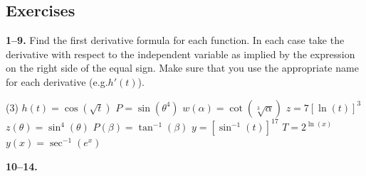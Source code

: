 \documentclass[10pt,oneside,]{book}
\theoremstyle{plain}
\theoremstyle{definition}
\numberwithin{equation}{section}
\newcounter{figstack}
\newcounter{figindex}
\newlength\fight
\newcommand\pushValignCaptionBottom[5][b]{%
\stepcounter{figstack}%
\expandafter\def\csname %
figalign\romannumeral\value{figstack}\endcsname{#1}%
\expandafter\def\csname %
figtype\romannumeral\value{figstack}\endcsname{#2}%
\expandafter\def\csname %
figwd\romannumeral\value{figstack}\endcsname{#3}%
\expandafter\def\csname %
figcontent\romannumeral\value{figstack}\endcsname{#4}%
\expandafter\def\csname %
figcap\romannumeral\value{figstack}\endcsname{#5}%
\setbox0=\hbox{%
\begin{#2}{#3}#4\end{#2}}%
\ifdim\dimexpr\ht0+\dp0\relax>\fight\global\setlength{\fight}{%
\dimexpr\ht0+\dp0\relax}\fi%
}
\newcommand\popValignCaptionBottom{%
\setcounter{figindex}{0}%
\hfill%
\whiledo{\value{figindex}<\value{figstack}}{%
\stepcounter{figindex}%
\def\tmp{\csname figwd\romannumeral\value{figindex}\endcsname}%
\begin{\csname figtype\romannumeral\value{figindex}\endcsname}[t]{\tmp}%
\centering%
\stackinset{c}{}%
{\csname figalign\romannumeral\value{figindex}\endcsname}{}%
{\csname figcontent\romannumeral\value{figindex}\endcsname}%
{\rule{0pt}{\fight}}\par%
\csname figcap\romannumeral\value{figindex}\endcsname%
\end{\csname figtype\romannumeral\value{figindex}\endcsname}%
\hfill%
}%
\setcounter{figstack}{0}%
\setlength{\fight}{0pt}%
\hfill%
}
\newcommand{\fe}[2]{#1\mathopen{}\left(#2\right)\mathclose{}}
\newcommand{\fd}[1]{#1'}
\begin{document}
\subsection[Exercises]{Exercises}\label{exercises-43}
\textbf{1--9. }\hypertarget{exercisegroup-92}{\null}Find the first derivative formula for each function.  In each case take the derivative with respect to the independent variable as implied by the expression on the right side of the equal sign.  Make sure that you use the appropriate name for each derivative (e.g.\@ \(\fe{\fd{h}}{t}\)).%
\par
\begin{exercisegroup}(3)
\exercise[1.]\hypertarget{exercise-442}{\null}\(\fe{h}{t}=\fe{\cos}{\sqrt{t}}\)%
\exercise[2.]\hypertarget{exercise-443}{\null}\(P=\fe{\sin}{\theta^4}\)%
\exercise[3.]\hypertarget{exercise-444}{\null}\(\fe{w}{\alpha}=\fe{\cot}{\sqrt[3]{\alpha}}\)%
\exercise[4.]\hypertarget{exercise-445}{\null}\(z=7\left[\fe{\ln}{t}\right]^3\)%
\exercise[5.]\hypertarget{exercise-446}{\null}\(\fe{z}{\theta}=\fe{\sin^4}{\theta}\)%
\exercise[6.]\hypertarget{exercise-447}{\null}\(\fe{P}{\beta}=\fe{\tan^{-1}}{\beta}\)%
\exercise[7.]\hypertarget{exercise-448}{\null}\(y=\left[\fe{\sin^{-1}}{t}\right]^{17}\)%
\exercise[8.]\hypertarget{exercise-449}{\null}\(T=2^{\fe{\ln}{x}}\)%
\exercise[9.]\hypertarget{exercise-450}{\null}\(\fe{y}{x}=\fe{\sec^{-1}}{e^x}\)%
\end{exercisegroup}
\par\smallskip\noindent
\textbf{10--14. }\hypertarget{exercisegroup-93}{\null}
\end{document}
